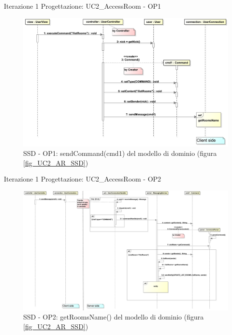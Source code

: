 \documentclass[t]{beamer} %
\begin{document}
\begin{frame} {Iterazione 1 Progettazione: UC2\_AccessRoom - OP1}
   \begin{figure}
     \includegraphics[scale=0.23]{image_astah/Iteration_1_DesignModel/UC2_AccessRoom_SSD_1_sendCommand.png}{\centering}
     \caption{SSD - OP1: sendCommand(cmd1) del modello di dominio (figura \ref{fig_UC2_AR_SSD}) }
     \label{fig_UC2_SSD_AC_1} 
   \end{figure}
\end{frame}

\begin{frame} {Iterazione 1 Progettazione: UC2\_AccessRoom - OP2}
   \begin{figure}
     \includegraphics[scale=0.15]{image_astah/Iteration_1_DesignModel/UC2_AccessRoom_SSD_2_getRoomsName.png}{\centering}
     \caption{SSD - OP2: getRoomsName() del modello di dominio (figura \ref{fig_UC2_AR_SSD}) }
     \label{fig_UC2_SSD_AC_2} 
   \end{figure}
\end{frame}
\end{document}
